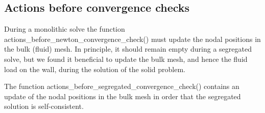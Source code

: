\hypertarget{index_actions}{}\subsection{Actions before convergence checks}\label{index_actions}
During a monolithic solve the function {\ttfamily actions\+\_\+before\+\_\+newton\+\_\+convergence\+\_\+check()} must update the nodal positions in the bulk (fluid) mesh. In principle, it should remain empty during a segregated solve, but we found it beneficial to update the bulk mesh, and hence the fluid load on the wall, during the solution of the solid problem.

The function {\ttfamily actions\+\_\+before\+\_\+segregated\+\_\+convergence\+\_\+check()} contains an update of the nodal positions in the bulk mesh in order that the segregated solution is self-\/consistent.

